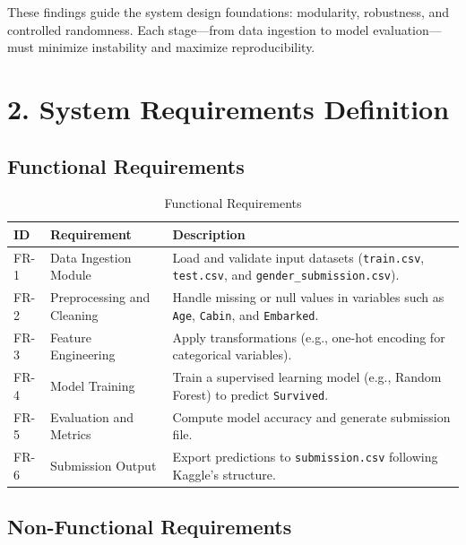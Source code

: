 \documentclass[12pt]{report}
\begin{document}
These findings guide the system design foundations: modularity, robustness, and controlled randomness. Each stage—from data ingestion to model evaluation—must minimize instability and maximize reproducibility.

\section*{2. System Requirements Definition}

\subsection*{Functional Requirements}

\begin{table}[H]
\centering
\begin{tabular}{|p{1cm}|p{4cm}|p{9cm}|}
\hline
\textbf{ID} & \textbf{Requirement} & \textbf{Description} \\ \hline
FR-1 & Data Ingestion Module & Load and validate input datasets (\texttt{train.csv}, \texttt{test.csv}, and \texttt{gender\_submission.csv}). \\ \hline
FR-2 & Preprocessing and Cleaning & Handle missing or null values in variables such as \texttt{Age}, \texttt{Cabin}, and \texttt{Embarked}. \\ \hline
FR-3 & Feature Engineering & Apply transformations (e.g., one-hot encoding for categorical variables). \\ \hline
FR-4 & Model Training & Train a supervised learning model (e.g., Random Forest) to predict \texttt{Survived}. \\ \hline
FR-5 & Evaluation and Metrics & Compute model accuracy and generate submission file. \\ \hline
FR-6 & Submission Output & Export predictions to \texttt{submission.csv} following Kaggle’s structure. \\ \hline
\end{tabular}
\caption{Functional Requirements}
\end{table}

\subsection*{Non-Functional Requirements}
\end{document}
